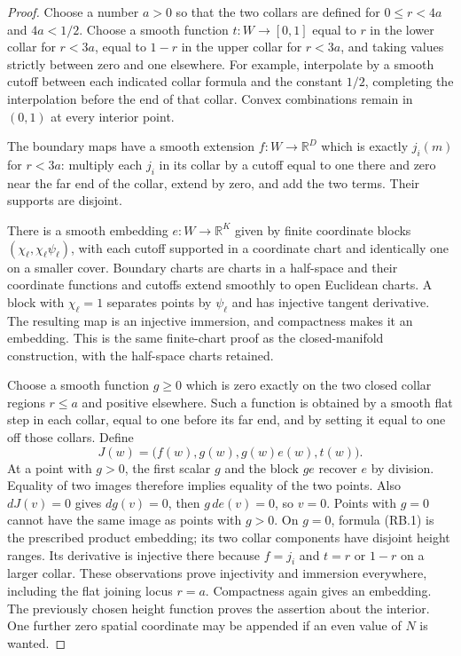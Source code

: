 \begin{proof}
Choose a number $a>0$ so that the two collars are defined for $0\le r<4a$
and $4a<1/2$.  Choose a smooth function $t:W\to[0,1]$ equal to $r$ in
the lower collar for $r<3a$, equal to $1-r$ in the upper collar for
$r<3a$, and taking values strictly between zero and one elsewhere.
For example, interpolate by a smooth cutoff between each indicated
collar formula and the constant $1/2$, completing the interpolation
before the end of that collar.  Convex combinations remain in $(0,1)$
at every interior point.

The boundary maps have a smooth extension $f:W\to\mathbb R^D$ which is
exactly $j_i(m)$ for $r<3a$: multiply each $j_i$ in its collar by a
cutoff equal to one there and zero near the far end of the collar,
extend by zero, and add the two terms.  Their supports are disjoint.

There is a smooth embedding $e:W\to\mathbb R^K$ given by finite
coordinate blocks $(\chi_\ell,\chi_\ell\psi_\ell)$, with each cutoff
supported in a coordinate chart and identically one on a smaller cover.
Boundary charts are charts in a half-space and their coordinate
functions and cutoffs extend smoothly to open Euclidean charts.  A
block with $\chi_\ell=1$ separates points by $\psi_\ell$ and has
injective tangent derivative.  The resulting map is an injective
immersion, and compactness makes it an embedding.  This is the same
finite-chart proof as the closed-manifold construction, with the
half-space charts retained.

Choose a smooth function $g\geq0$ which is zero exactly on the two
closed collar regions $r\leq a$ and positive elsewhere.  Such a
function is obtained by a smooth flat step in each collar, equal to
one before its far end, and by setting it equal to one off those
collars.  Define
\[
 J(w)=\bigl(f(w),g(w),g(w)e(w),t(w)\bigr).
 \tag{RB.1}
\]
At a point with $g>0$, the first scalar $g$ and the block $ge$ recover
$e$ by division.  Equality of two images therefore implies equality
of the two points.  Also $dJ(v)=0$ gives $dg(v)=0$, then $g\,de(v)=0$,
so $v=0$.  Points with $g=0$ cannot have the same image as points with
$g>0$.  On $g=0$, formula (RB.1) is the prescribed product embedding;
its two collar components have disjoint height ranges.  Its derivative
is injective there because $f=j_i$ and $t=r$ or $1-r$ on a larger
collar.  These observations prove injectivity and immersion everywhere,
including the flat joining locus $r=a$.  Compactness again gives an
embedding.  The previously chosen height function proves the assertion
about the interior.  One further zero spatial coordinate may be
appended if an even value of $N$ is wanted.
\end{proof}

